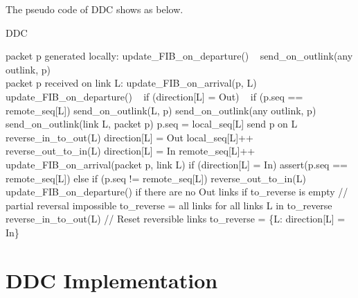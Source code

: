 The pseudo code of DDC shows as below. 


\begin{algorithm}[]
    \newcommand{\INDSTATE}[1][1]{\STATE\hspace{#1\algorithmicindent}}
    \caption{DDC}
    \begin{algorithmic}[1]
    \label{algo:DDC}
    
    {\small
    \linenumbers
        \INDSTATE packet p generated locally:
            \INDSTATE[2] update\_FIB\_on\_departure() \
            \INDSTATE[2] send\_on\_outlink(any outlink, p) \\[0.1in]
        \INDSTATE packet p received on link L:
            \INDSTATE[2] update\_FIB\_on\_arrival(p, L) \
            \INDSTATE[2] update\_FIB\_on\_departure() \
            \INDSTATE[2] if (direction[L] = Out) \
            \INDSTATE[4] if (p.seq == remote\_seq[L])
            \INDSTATE[6] send\_on\_outlink(L, p)
            \INDSTATE[4] \linelabel{algo:any out link}send\_on\_outlink(any outlink, p) 
        \\[0.1in]
        \INDSTATE send\_on\_outlink(link L, packet p)
        \INDSTATE[2] p.seq = local\_seq[L]
        \INDSTATE[2] send p on L
        \\[0.1in]
        \INDSTATE reverse\_in\_to\_out(L)
        \INDSTATE[2] direction[L] = Out
        \INDSTATE[2] local\_seq[L]++
        \\[0.1in]
        \INDSTATE reverse\_out\_to\_in(L)
        \INDSTATE[2] direction[L] = In
        \INDSTATE[2] remote\_seq[L]++
        \\[0.1in]
        \INDSTATE update\_FIB\_on\_arrival(packet p, link L)
        \INDSTATE[2] if (direction[L] = In)
        \INDSTATE[4] assert(p.seq == remote\_seq[L])
        \INDSTATE[2] else if (p.seq != remote\_seq[L])
        \INDSTATE[4] reverse\_out\_to\_in(L)
        \\[0.1in]
        \INDSTATE update\_FIB\_on\_departure()
        \INDSTATE[2] if there are no Out links
        \INDSTATE[4] if to\_reverse is empty // partial reversal impossible
        \INDSTATE[6] to\_reverse = all links
        \INDSTATE[2] for all links L in to\_reverse
        \INDSTATE[4] reverse\_in\_to\_out(L) // Reset reversible links
        \INDSTATE[4] to\_reverse = \{L: direction[L] = In\}}
    \end{algorithmic}
\end{algorithm}

\section{DDC Implementation}

